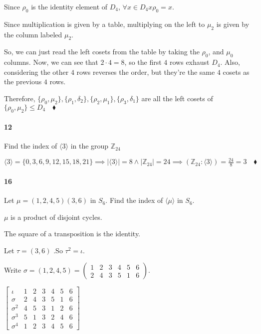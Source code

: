 \documentclass{article}
\newcommand\Z{\mathbb{Z}}
\begin{document}

Since $\rho_0$ is the identity element of $D_4$, $\forall x \in D_4 x
\rho_0 = x$.

Since multiplication is given by a table, multiplying on the left to
$\mu_2$ is given by the column labeled  $\mu_2$.

So, we can just read the left cosets from the table by taking the
$\rho_0$, and $\mu_0$ columns. Now, we can see that $2\cdot 4 =8$, so
the first $4$ rows exhaust $D_4$. Also, considering the other $4$
rows reverses the order, but they're the same $4$ cosets as the
previous $4$ rows.

Therefore,
$\{\rho_0,\mu_2\},\{\rho_1,\delta_2\},\{\rho_2,\mu_1\},\{\rho_3,\delta_1\}$
are all the left cosets of $\{\rho_0,\mu_2\}\leq D_4\quad \blacklozenge$


\paragraph{12} Find the index of $\langle 3 \rangle$ in the group
$\Z_24$

 $\langle 3 \rangle = \{0,3,6,9,12,15,18,21\} \implies | \langle
3\rangle| = 8 \land |\Z_{24}| = 24  \implies (\Z_{24}:\langle 3
\rangle) =\frac{24}{8} = 3\quad \blacklozenge$

\newpage
\paragraph{16} Let $\mu = (1,2,4,5)(3,6)$ in $S_6$. Find the index of
$\langle \mu \rangle$ in $S_6$.



$\mu$ is a product of disjoint cycles.

The square of a transposition is the identity.

Let $\tau = (3,6)$ .So $\tau^2 = \iota$.

Write $\sigma = (1,2,4,5) = \begin{pmatrix}1&2&3&4&5&6\\
  2&4&3&5&1&6\end{pmatrix}.$

$\begin{bmatrix}
   \iota& 1&2&3&4&5&6\\
    \sigma& 2&4&3&5&1&6 \\
  \sigma^2& 4&5&3&1&2&6 \\
  \sigma^3& 5&1&3&2&4&6 \\
  \sigma^4& 1&2&3&4&5&6
\end{bmatrix}$
\end{document}
